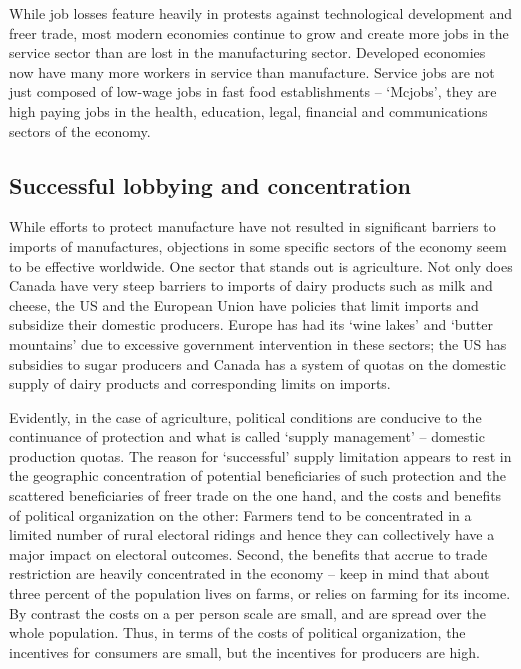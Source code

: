 While job losses feature heavily in protests against technological
development and freer trade, most modern economies continue to grow and
create more jobs in the service sector than are lost in the manufacturing
sector. Developed economies now have many more workers in service than
manufacture. Service jobs are not just composed of low-wage jobs in fast
food establishments -- `Mcjobs', they are high paying jobs in the health,
education, legal, financial and communications sectors of the economy.

\newhtmlpage

\subsection*{Successful lobbying and concentration}

While efforts to protect manufacture have not resulted in significant
barriers to imports of manufactures, objections in some specific sectors of
the economy seem to be effective worldwide. One sector that stands out is
agriculture. Not only does Canada have very steep barriers to imports of
dairy products such as milk and cheese, the US and the European Union have
policies that limit imports and subsidize their domestic producers. Europe
has had its `wine lakes' and `butter mountains' due to excessive government
intervention in these sectors; the US has subsidies to sugar producers and
Canada has a system of quotas on the domestic supply of dairy products and
corresponding limits on imports.

Evidently, in the case of agriculture, political conditions are conducive to
the continuance of protection and what is called `supply management' --
domestic production quotas. The reason for `successful' supply limitation
appears to rest in the geographic concentration of potential beneficiaries
of such protection and the scattered beneficiaries of freer trade on the one
hand, and the costs and benefits of political organization on the other:
Farmers tend to be concentrated in a limited number of rural electoral
ridings and hence they can collectively have a major impact on electoral
outcomes. Second, the benefits that accrue to trade restriction are heavily
concentrated in the economy -- keep in mind that about three percent of the
population lives on farms, or relies on farming for its income. By contrast
the costs on a per person scale are small, and are spread over the whole
population. Thus, in terms of the costs of political organization, the
incentives for consumers are small, but the incentives for producers are
high.

